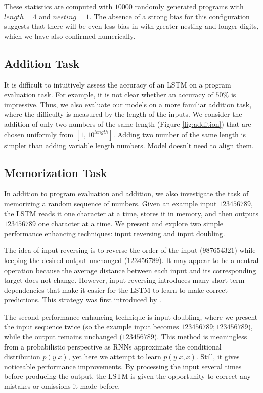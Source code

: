 These statistics are computed with $10000$ randomly generated programs with $length=4$ and $nesting=1$. The absence of a strong bias for this configuration suggests that there will be even less bias in with greater nesting and longer digits, which we have also confirmed numerically.

\subsection{Addition Task}

\label{sec:add}

It is difficult to intuitively assess the accuracy of an LSTM on a program evaluation task. For example, it is not clear whether an accuracy of  $50\%$  
is impressive. Thus, we also evaluate our models on a more familiar addition task, where the difficulty is measured by the length of the inputs.  We consider the addition of only two numbers of the same length (Figure \ref{fig:addition})
that are chosen uniformly from $[1, 10^{length}]$. Adding two number of the same length is simpler than adding variable length numbers. Model doesn't need to align them.

\subsection{Memorization Task}

\label{sec:copy}

In addition to program evaluation and addition, we also investigate the task of memorizing a random sequence of numbers. Given an example input $123456789$, the LSTM reads it one character at a time, stores it in memory, and then outputs $123456789$ one character at a time. We present and explore two simple performance enhancing techniques: input reversing \citet{sutskever2014sequence} and input doubling.

The idea of input reversing is to reverse the order of the input ($987654321$) while keeping the desired output unchanged ($123456789$). It may appear to be a neutral operation because the average distance between each input and its corresponding target does not change. However, input reversing introduces many short term dependencies that make it easier for the LSTM to learn to make correct predictions. This strategy was first introduced by \citet{sutskever2014sequence}.

The second performance enhancing technique is input doubling, where we present the input sequence twice  (so the example input becomes $123456789;123456789$), while the output remains unchanged ($123456789$). This method is meaningless from a probabilistic perspective as RNNs approximate the conditional distribution $p(y|x)$, yet here we attempt to learn $p(y|x, x)$. Still, it gives noticeable performance improvements. By processing the input several times before producing the output, the LSTM is given the opportunity to correct any mistakes or omissions it made before.

